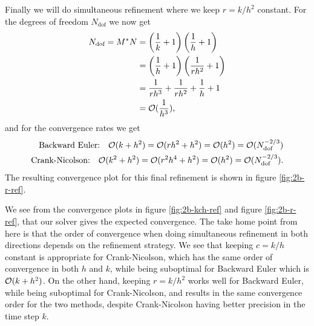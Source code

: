 Finally we will do simultaneous refinement where we keep $r=k/h^2$ constant. 
For the degrees of freedom $N_\text{dof}$ we now get 
\begin{equation*}
\begin{split}
    N_\text{dof} = M^* N & = \left(\frac{1}{k}+1\right)\left(\frac{1}{h}+1\right)
    \\ & = \left(\frac{1}{h}+1\right)\left(\frac{1}{rh^2}+1\right)
    \\ & = \frac{1}{rh^3} + \frac{1}{rh^2} + \frac{1}{h} + 1 
    \\ & = \mathcal{O}(\frac{1}{h^3}), 
\end{split}
\end{equation*}
and for the convergence rates we get 
\begin{equation*}
\begin{split}
    \text{Backward Euler:} \quad \mathcal{O}(k+h^2) = \mathcal{O}(rh^2+h^2) = \mathcal{O}(h^2) = \mathcal{O}(N_\text{dof}^{-2/3})\\
    \text{Crank-Nicolson:} \quad \mathcal{O}(k^2+h^2) = \mathcal{O}(r^2 h^4+h^2) = \mathcal{O}(h^2) = \mathcal{O}(N_\text{dof}^{-2/3}). 
\end{split}
\end{equation*}
The resulting convergence plot for this final refinement is shown in figure \ref{fig:2b-r-ref}. 

We see from the convergence plots in figure \ref{fig:2b-kch-ref} and figure \ref{fig:2b-r-ref}, 
that our solver gives the expected convergence. 
The take home point from here is that the order of convergence when doing simultaneous refinement in both directions depends on the refinement strategy. 
We see that keeping $c=k/h$ constant is appropriate for Crank-Nicolson, 
which has the same order of convergence in both $h$ and $k$, 
while being suboptimal for Backward Euler which is $\mathcal{O}(k + h^2)$. 
On the other hand, keeping $r=k/h^2$ works well for Backward Euler, 
while being suboptimal for Crank-Nicolson, 
and results in the same convergence order for the two methods, 
despite Crank-Nicolson having better precision in the time step $k$. 


